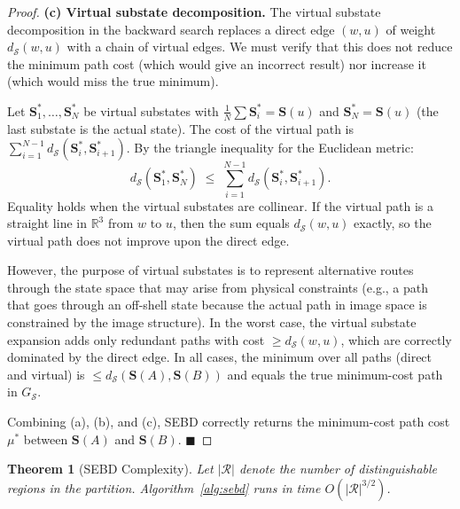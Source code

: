 \documentclass[twocolumn]{article}
\theoremstyle{plain}
\newtheorem{theorem}{Theorem}[section]
\theoremstyle{definition}
\newcommand{\SS}{\mathcal{S}}
\newcommand{\bS}{\mathbf{S}}
\newcommand{\dS}{d_{\mathcal{S}}}
\newcommand{\reals}{\mathbb{R}}
\newcommand{\qed}{\hfill$\blacksquare$}
\begin{document}
\begin{proof}
\textbf{(c) Virtual substate decomposition.} The virtual substate decomposition
in the backward search replaces a direct edge $(w,u)$ of weight $\dS(w,u)$ with
a chain of virtual edges. We must verify that this does not reduce the minimum
path cost (which would give an incorrect result) nor increase it (which would
miss the true minimum).

Let $\bS_1^*, \ldots, \bS_N^*$ be virtual substates with $\frac{1}{N}\sum \bS_i^* = \bS(u)$
and $\bS_N^* = \bS(u)$ (the last substate is the actual state). The cost of
the virtual path is $\sum_{i=1}^{N-1} \dS(\bS_i^*, \bS_{i+1}^*)$. By the
triangle inequality for the Euclidean metric:
\[
  \dS(\bS_1^*, \bS_N^*) \;\leq\; \sum_{i=1}^{N-1} \dS(\bS_i^*, \bS_{i+1}^*).
\]
Equality holds when the virtual substates are collinear. If the virtual path is
a straight line in $\reals^3$ from $w$ to $u$, then the sum equals $\dS(w, u)$
exactly, so the virtual path does not improve upon the direct edge.

However, the purpose of virtual substates is to represent alternative routes
through the state space that may arise from physical constraints (e.g., a path
that goes through an off-shell state because the actual path in image space
is constrained by the image structure). In the worst case, the virtual substate
expansion adds only redundant paths with cost $\geq \dS(w,u)$, which are
correctly dominated by the direct edge. In all cases, the minimum over all
paths (direct and virtual) is $\leq \dS(\bS(A), \bS(B))$ and equals the true
minimum-cost path in $G_\SS$.

Combining (a), (b), and (c), SEBD correctly returns the minimum-cost path cost
$\mu^*$ between $\bS(A)$ and $\bS(B)$. \qed
\end{proof}

\begin{theorem}[SEBD Complexity]
\label{thm:complexity}
Let $|\mathcal{R}|$ denote the number of distinguishable regions in the partition.
Algorithm~\ref{alg:sebd} runs in time $O(|\mathcal{R}|^{3/2})$.
\end{theorem}
\end{document}
